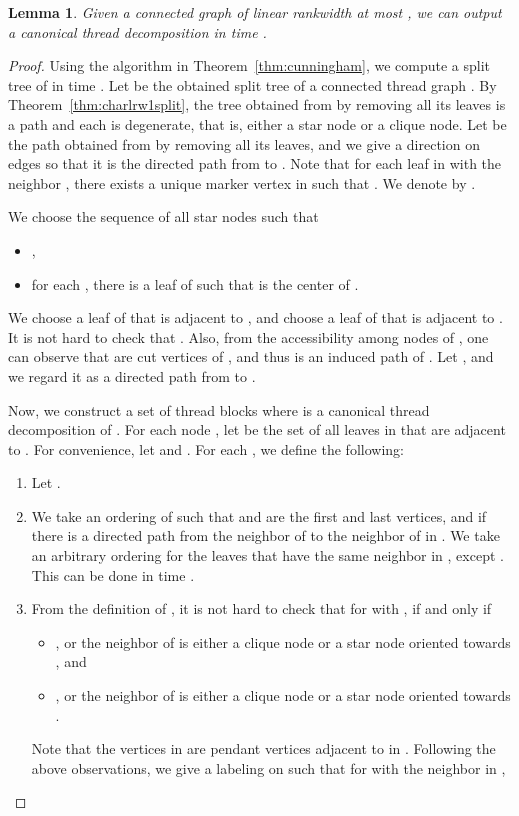 \documentclass[11pt]{article}
\newtheorem{lemma}[theorem]{Lemma}
\theoremstyle{remark}
\begin{document}
\begin{lemma}\label{lem:splittreetothreadblock}
Given a connected graph  of linear rankwidth at most , 
we can output a canonical thread decomposition  in time . 
\end{lemma}
\begin{proof}
Using the algorithm in Theorem~\ref{thm:cunningham}, we compute a split tree of  in time .
Let  be the obtained split tree of a connected thread graph .
By Theorem~\ref{thm:charlrw1split}, the tree obtained from  by removing all its leaves is a path and each  is degenerate, that is, either a star node or a clique node.
Let  be the path  obtained from  by removing all its leaves, and we give a direction on edges so that it is the directed path from  to .
Note that for each leaf  in  with the neighbor , there exists a unique marker vertex  in  such that
.
We denote by .



We choose the sequence  of all star nodes such that  
\begin{itemize}
\item , 
\item for each , there is a leaf  of  such that  is the center of .
\end{itemize}
We choose a leaf  of  that is adjacent to , 
and choose a leaf  of  that is adjacent to .
It is not hard to check that .
Also, from the accessibility among nodes of , one can observe that  are cut vertices of , and thus  is an induced path of .
Let , and we regard it as a directed path from  to .


Now, we construct a set of thread blocks  where 
  is a canonical thread decomposition of .
For each node , let  be the set of all leaves in  that are adjacent to .
For convenience, let  and .
For each , we define the following:
\begin{enumerate}
\item Let .
\item We take an ordering  of  such that  and  are the first and last vertices, and 
 if there is a directed path from the neighbor of  to the neighbor of  in . We take an arbitrary ordering for the leaves that have the same neighbor in ,  except . 
This can be done in time .
\item 
From the definition of , 
it is not hard to check that for  with ,  if and only if 
\begin{itemize}
\item , or the neighbor of  is either a clique node or a star node oriented towards , and 
\item , or the neighbor of  is either a clique node or a star node oriented towards . 
\end{itemize}
Note that the vertices in  are pendant vertices adjacent to  in . 
Following the above observations, we give a labeling  on  such that
for  with the neighbor  in ,
 

\end{enumerate}
\end{proof}
\end{document}
